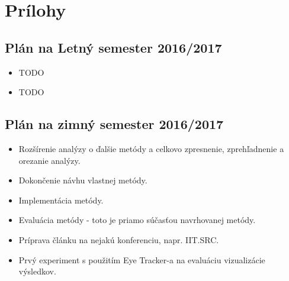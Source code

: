 \label{app.01}
\appendix
\chapter*{Prílohy}
\renewcommand{\thesection}{\Alph{section}}


\section{Plán na Letný semester 2016/2017}\label{plan-leto}
\begin{itemize}
	\item TODO
	\item TODO
\end{itemize}

\section{Plán na zimný semester 2016/2017}\label{plan-zima}
\begin{itemize}
	\item Rozšírenie analýzy o ďalšie metódy a celkovo zpresnenie, zprehľadnenie a orezanie analýzy.
	\item Dokončenie návhu vlastnej metódy.
	\item Implementácia metódy.
	\item Evaluácia metódy - toto je priamo súčasťou navrhovanej metódy.
	\item Príprava článku na nejakú konferenciu, napr. IIT.SRC.
	\item Prvý experiment s použitím Eye Tracker-a na evaluáciu vizualizácie výsledkov.
\end{itemize}

